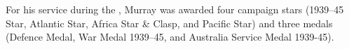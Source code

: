
For his service during the , Murray was awarded four campaign stars (1939--45 Star, Atlantic Star, Africa Star \& Clasp, and Pacific Star) and three medals (Defence Medal, War Medal 1939--45, and Australia Service Medal 1939-45).


\begin{references}


\end{references}
